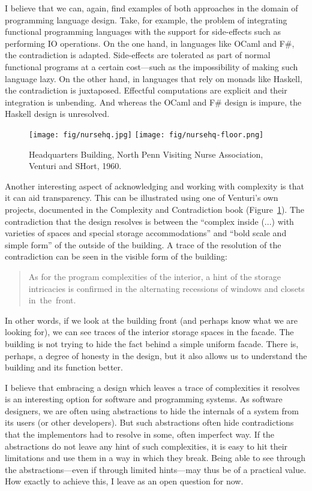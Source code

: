 I believe that we can, again, find examples of both approaches in the domain of programming
language design. Take, for example, the problem of integrating functional programming languages
with the support for side-effects such as performing IO operations. On the one hand, in languages
like OCaml and F\#, the contradiction is adapted. Side-effects are tolerated as part of normal
functional programs at a certain cost---such as the impossibility of making such language lazy.
On the other hand, in languages that rely on monads like Haskell, the contradiction is juxtaposed.
Effectful computations are explicit and their integration is unbending. And whereas the OCaml and
F\# design is impure, the Haskell design is unresolved.

\begin{figure}
\centering
\texttt{[image: fig/nursehq.jpg]}\quad
\texttt{[image: fig/nursehq-floor.png]}
\caption{Headquarters Building, North Penn Visiting Nurse Association, Venturi and SHort, 1960.}
\label{fig:nursehq}
\end{figure}

Another interesting aspect of acknowledging and working with complexity is that it can aid
transparency. This can be illustrated using one of Venturi's own projects, documented in the
Complexity and Contradiction book (Figure~\ref{fig:nursehq}). The contradiction that the design
resolves is between the ``complex inside (...) with varieties of spaces and special storage
accommodations'' and ``bold scale and simple form'' of the outside of the building. A trace of
the resolution of the contradiction can be seen in the visible form of the building:

\begin{quote}
As for the program complexities of the interior, a hint of the storage intricacies is
confirmed in the alternating recessions of windows and closets in~the~front.
\end{quote}

In other words, if we look at the building front (and perhaps know what we are looking for),
we can see traces of the interior storage spaces in the facade. The building is not trying to
hide the fact behind a simple uniform facade. There is, perhaps, a degree of honesty in the
design, but it also allows us to understand the building and its function better.

I believe that embracing a design which leaves a trace of complexities it resolves is an interesting
option for software and programming systems. As software designers, we are often using abstractions
to hide the internals of a system from its users (or other developers). But such abstractions often
hide contradictions that the implementors had to resolve in some, often imperfect way. If the
abstractions do not leave any hint of such complexities, it is easy to hit their limitations and
use them in a way in which they break. Being able to see through the abstractions---even if
through limited hints---may thus be of a practical value.
How exactly to achieve this, I leave as an open question for now.

